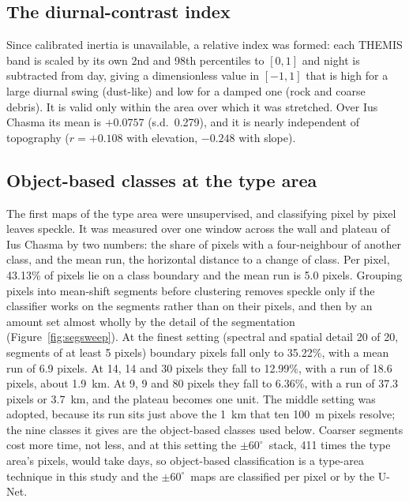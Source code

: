 \documentclass[twocolumn]{aastex701}
\newcommand{\pmsixty}{$\pm60^{\circ}$}
\begin{document}
\subsection{The diurnal-contrast index}

Since calibrated inertia is unavailable, a relative index was formed: each THEMIS band is scaled by its own 2nd and
98th percentiles to $[0,1]$ and night is subtracted from day, giving a dimensionless value in $[-1,1]$ that is high for
a large diurnal swing (dust-like) and low for a damped one (rock and coarse debris). It is valid only within the area
over which it was stretched. Over Ius Chasma its mean is $+0.0757$ (s.d.\ 0.279), and it is nearly independent of
topography ($r=+0.108$ with elevation, $-0.248$ with slope). %

\subsection{Object-based classes at the type area} \label{sec:segments}

The first maps of the type area were unsupervised, and classifying pixel by pixel leaves speckle. It was measured over
one window across the wall and plateau of Ius Chasma by two numbers: the share of pixels with a four-neighbour of
another class, and the mean run, the horizontal distance to a change of class. Per pixel, 43.13\% of pixels lie on a
class boundary and the mean run is 5.0 pixels. Grouping pixels into mean-shift segments \citep{Comaniciu2002} before
clustering removes speckle only if the classifier works on the segments rather than on their pixels, and then by an
amount set almost wholly by the detail of the segmentation (Figure~\ref{fig:segsweep}). At the finest setting
(spectral and spatial detail 20 of 20, segments of at least 5 pixels) boundary pixels fall only to 35.22\%, with a mean
run of 6.9 pixels. At 14, 14 and 30 pixels they fall to 12.99\%, with a run of 18.6 pixels, about 1.9~km. At 9, 9
and 80 pixels they fall to 6.36\%, with a run of 37.3 pixels or 3.7~km, and the plateau becomes one unit. The middle
setting was adopted, because its run sits just above the 1~km that ten 100~m pixels resolve; the nine classes it gives
are the object-based classes used below. Coarser segments cost more time, not less, and at this setting the
\pmsixty\ stack, 411 times the type area's pixels, would take days, so object-based classification is a type-area
technique in this study and the \pmsixty\ maps are classified per pixel or by the U-Net. %
\end{document}
